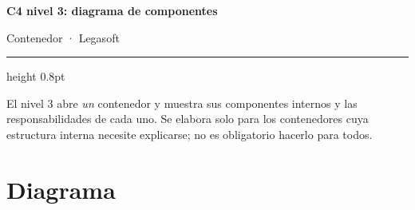 \documentclass[11pt,a4paper]{article}
\begin{document}
\begin{center}
{\sffamily\bfseries\LARGE\color{lgPrimario} C4 nivel 3: diagrama de componentes\par}
\vspace{2pt}
{\sffamily\normalsize\color{lgGris} Contenedor  · Legasoft\par}
\end{center}
\vspace{6pt}
{\color{lgBorde}\hrule height 0.8pt}
\vspace{10pt}

\begin{porcompletar}
El nivel 3 abre \emph{un} contenedor y muestra sus componentes internos y las
responsabilidades de cada uno. Se elabora solo para los contenedores cuya
estructura interna necesite explicarse; no es obligatorio hacerlo para todos.
\end{porcompletar}

\section*{Diagrama}
\end{document}
